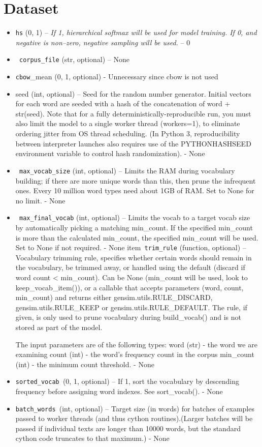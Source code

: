 \chapter{Dataset}
\begin{itemize}
  \item  \texttt{hs} ({0, 1}) --\textit{ If 1, hierarchical softmax will be used for model training. If 0, and negative is non--zero, negative sampling will be used. }-- 0
 \item  \texttt{ corpus\_file} (str, optional) – None
   \item \texttt{cbow}\_mean ({0, 1}, optional) - Unnecessary since cbow is not used
    \item seed (int, optional) – Seed for the random number generator. Initial vectors for each word are seeded with a hash of the concatenation of word + str(seed). Note that for a fully deterministically-reproducible run, you must also limit the model to a single worker thread (workers=1), to eliminate ordering jitter from OS thread scheduling. (In Python 3, reproducibility between interpreter launches also requires use of the PYTHONHASHSEED environment variable to control hash randomization). - None 
\item   \texttt{ max\_vocab\_size} (int, optional) – Limits the RAM during vocabulary building; if there are more unique words than this, then prune the infrequent ones. Every 10 million word types need about 1GB of RAM. Set to None for no limit. - None 
\item \texttt{   max\_final\_vocab} (int, optional) – Limits the vocab to a target vocab size by automatically picking a matching min\_count. If the specified min\_count is more than the calculated min\_count, the specified min\_count will be used. Set to None if not required. - None
item\texttt{   trim\_rule} (function, optional) –Vocabulary trimming rule, specifies whether certain words should remain in the vocabulary, be trimmed away, or handled using the default (discard if word count < min\_count). Can be None (min\_count will be used, look to keep\_vocab\_item()), or a callable that accepts parameters (word, count, min\_count) and returns either gensim.utils.RULE\_DISCARD, gensim.utils.RULE\_KEEP or gensim.utils.RULE\_DEFAULT. The rule, if given, is only used to prune vocabulary during build\_vocab() and is not stored as part of the model.

    The input parameters are of the following types:
            word (str) - the word we are examining
            count (int) - the word’s frequency count in the corpus
            min\_count (int) - the minimum count threshold. - None

  \item  \texttt{sorted\_vocab }({0, 1}, optional) – If 1, sort the vocabulary by descending frequency before assigning word indexes. See sort\_vocab(). - None
 \item   \texttt{batch\_words }(int, optional) – Target size (in words) for batches of examples passed to worker threads (and thus cython routines).(Larger batches will be passed if individual texts are longer than 10000 words, but the standard cython code truncates to that maximum.) - None 
\end{itemize}

